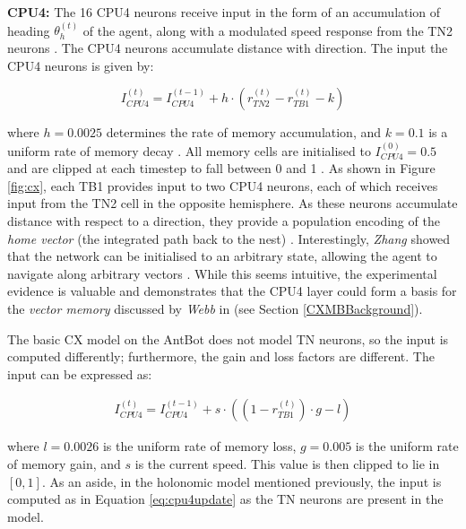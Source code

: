 \documentclass[a4paper,11pt,twoside,openright]{article}
\begin{document}
\textbf{CPU4:}
The 16 CPU4 neurons receive input in the form of an accumulation of
heading $\theta_h^{(t)}$ of the agent, along with a modulated speed response
from the TN2 neurons \cite{Stone2017}. The CPU4 neurons accumulate distance with
direction. The input the CPU4 neurons is given by:

\begin{equation}
  \label{eq:cpu4update}
I_{CPU4}^{(t)} = I_{CPU4}^{(t - 1)} + h \cdot (r_{TN2}^{(t)} - r_{TB1}^{(t)} - k)
\end{equation}

where $h = 0.0025$ determines the rate of memory accumulation, and $k = 0.1$ is
a uniform rate of memory decay \cite{Stone2017}. All memory cells are initialised
to $I_{CPU4}^{(0)} = 0.5$ and are clipped at each timestep to fall between 0 and
1 \cite{Stone2017}. As shown in Figure \ref{fig:cx}, each TB1 provides input to
two CPU4 neurons, each of which receives input from the TN2 cell in the opposite
hemisphere. As these neurons accumulate distance with respect to a direction,
they provide a population encoding of the \textit{home vector} (the integrated
path back to the nest) \cite{Stone2017}. Interestingly, \textit{Zhang} showed
that the network can be initialised to an arbitrary state, allowing the agent
to navigate along arbitrary vectors \cite{Zhang2017}. While this seems intuitive,
the experimental evidence is valuable and demonstrates that the CPU4 layer could
form a basis for the \textit{vector memory} discussed by \textit{Webb} in
\cite{Webb2019} (see Section \ref{CXMBBackground}).
\newline
\par

The basic CX model on the AntBot does not model TN neurons, so the input is
computed differently; furthermore, the gain and loss factors are different.
The input can be expressed as:

\begin{align}
  I_{CPU4}^{(t)} =
  I_{CPU4}^{(t - 1)} + s \cdot ((1 - r_{TB1}^{(t)}) \cdot g - l)
\end{align}

where $l = 0.0026$ is the uniform rate of memory loss, $g = 0.005$ is the
uniform rate of memory gain, and $s$ is the current speed. This value is
then clipped to lie in $[0,1]$. As an aside, in the holonomic model
mentioned previously, the input is computed as in Equation \ref{eq:cpu4update}
as the TN neurons are present in the model.
\newline\par
\end{document}
